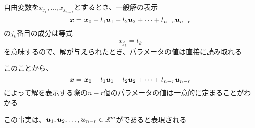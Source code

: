\documentclass[../../../topic_linear-equation]{subfiles}
\begin{document}
\sectionline

自由変数を$x_{j_1}, \dots, x_{j_{n-r}}$とするとき、一般解の表示
\begin{equation*}
  \vb*{x} = \vb*{x}_0 + t_1\vb*{u}_1 + t_2\vb*{u}_2 + \cdots + t_{n-r}\vb*{u}_{n-r}
\end{equation*}
の$j_k$番目の成分は等式
\begin{equation*}
  x_{j_k} = t_k
\end{equation*}
を意味するので、解が与えられたとき、パラメータの値は直接に読み取れる

\br

このことから、
\begin{equation*}
  \vb*{x} = \vb*{x}_0 + t_1\vb*{u}_1 + t_2\vb*{u}_2 + \cdots + t_{n-r}\vb*{u}_{n-r}
\end{equation*}
によって解を表示する際の$n-r$個のパラメータの値は一意的に定まることがわかる

この事実は、$\vb*{u}_1, \vb*{u}_2, \dots, \vb*{u}_{n-r} \in \mathbb{R}^m$がであると表現される
\end{document}
